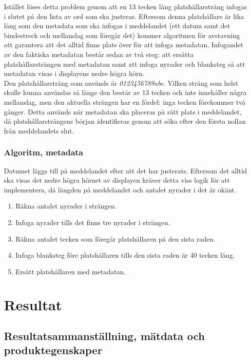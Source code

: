 \documentclass[a4paper,11pt]{article}
\begin{document}
Istället löses detta problem genom att en 13 tecken lång platshållarsträng infogas i slutet på den lista av ord som ska justeras. Eftersom denna platshållare är lika lång som den metadata som ska infogas i meddelandet (ett datum samt det bindestreck och mellanslag som föregår det) kommer algoritmen för avstavning att garantera att det alltid finns plats över för att infoga metadatan. Infogandet av den faktiska metadatan består sedan av två steg: att ersätta platshållarsträngen med metadatan samt att infoga nyrader och blanksteg så att metadatan visas i displayens nedre högra hörn. \\

Den platshållarsträng som används är {\it 0123456789abc}. Vilken sträng som helst skulle kunna användas så länge den består av 13 tecken och inte innehåller några mellanslag, men den aktuella strängen har en fördel: inga tecken förekommer två gånger. Detta används när metadatan ska placeras på rätt plats i meddelandet, då platshållarsträngens början identifieras genom att söka efter den första nollan från meddelandets slut. \\

\subsubsection{Algoritm, metadata}
Datumet läggs till på meddelandet efter att det har justerats. Eftersom det alltid ska visas det nedre högra hörnet av displayen kräver detta viss logik för att implementera, då längden på meddelandet och antalet nyrader i det är okänt.
	\begin{enumerate}
    	\item Räkna antalet nyrader i strängen.
    	\item Infoga nyrader tills det finns tre nyrader i strängen.
    	\item Räkna antalet tecken som föregår platshållaren på den sista raden.
    	\item Infoga blanksteg före platshållaren tills den sista raden är 40 tecken lång.	
    	\item Ersätt platshållaren med metadatan.
    	\end{enumerate}
    	
\section{Resultat}

\subsection{Resultatsammanställning, mätdata och produktegenskaper}
\end{document}
